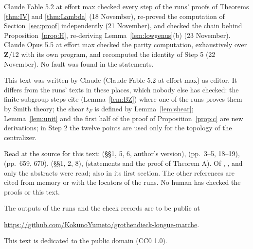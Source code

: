\documentclass[11pt,a4paper]{article}
\theoremstyle{plain}
\theoremstyle{definition}
\theoremstyle{remark}
\newcommand{\Z}{\mathbf Z}
\newcommand{\workbenchurl}{https://github.com/KokunoYumeto/grothendieck-longue-marche}
\begin{document}
Claude Fable 5.2 at effort max checked every step of the runs' proofs of Theorems \ref{thm:IV} and \ref{thm:Lambda}
(18 November), re-proved the computation of Section~\ref{sec:proof} independently (21 November), and checked the
chain behind Proposition~\ref{prop:H}, re-deriving Lemma~\ref{lem:lowgenus}(b) (23 November). Claude Opus 5.5 at
effort max checked the parity computation, exhaustively over $\Z/12$ with its own program, and recomputed the
identity of Step 5 (22 November). No fault was found in the statements.

This text was written by Claude (Claude Fable 5.2 at effort max) as editor. It differs from the runs' texts in
these places, which nobody else has checked: the finite-subgroup steps cite \cite{BZ} (Lemma~\ref{lem:BZ}) where one
of the runs proves them by Smith theory; the shear $t_F$ is defined by Lemma~\ref{lem:shear}; Lemma~\ref{lem:unit}
and the first half of the proof of Proposition~\ref{prop:c} are new derivations; in Step 2 the twelve points are
used only for the topology of the centralizer.

Read at the source for this text: \cite{NS} (\S\S1, 5, 6, author's version), \cite{HLS} (pp.~3--5, 18--19),
\cite{S} (pp.~659, 670), \cite{LNS} (\S\S1, 2, 8), \cite{BZ} (statements and the proof of Theorem A). Of
\cite{HMM}, \cite{BBR}, \cite{DG} and \cite{Co} only the abstracts were read; \cite{BBR} also in its first section. The
other references are cited from memory or with the locators of the runs. No human has checked the proofs or this
text.

The outputs of the runs and the check records are to be public at

{\raggedright\smallskip\noindent\url{\workbenchurl}.\par}

\smallskip
This text is dedicated to the public domain (CC0 1.0).
\end{document}
